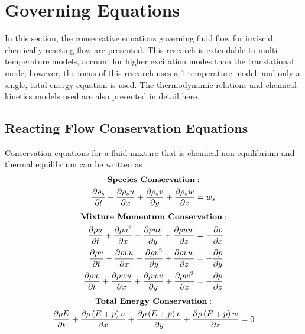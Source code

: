 \chapter{Governing Equations}
\label{chapter-two}

In this section, the conservative equations governing fluid flow for inviscid,
chemically reacting flow are presented.  This research is extendable to
multi-temperature models, account for higher excitation modes than the
translational mode; however, the focus of this research uses a 1-temperature
model, and only a single, total energy equation is used.  The thermodynamic
relations and chemical kinetics models used are also presented in detail here.

\section{Reacting Flow Conservation Equations}

Conservation equations for a fluid mixture that is chemical non-equilibrium and
thermal equilibrium can be written as
\begin{equation}
  \begin{gathered}
    \text{\bf{Species Conservation}}: \\
     \frac{\partial \rho_s}{\partial t} + \frac{\partial \rho_s u}{\partial x} + \frac{\partial \rho_s v}{\partial y} + \frac{\partial \rho_s w}{\partial z} =
     w_s
  \end{gathered}
  \label{species-cons}
\end{equation}
\begin{equation}
  \begin{gathered}
    \text{\bf{Mixture Momentum Conservation}}: \\
    \begin{aligned}
    \frac{\partial \rho u}{\partial t} + \frac{\partial \rho u^2}{\partial x} + \frac{\partial \rho u v}{\partial y} + \frac{\partial \rho u w}{\partial z} &= -\frac{\partial p}{\partial x}\\
    \frac{\partial \rho v}{\partial t} + \frac{\partial \rho v u}{\partial x} + \frac{\partial \rho v^2}{\partial y} + \frac{\partial \rho v w}{\partial z} &= -\frac{\partial p}{\partial y}\\
    \frac{\partial \rho w}{\partial t} + \frac{\partial \rho w u}{\partial x} + \frac{\partial \rho w v}{\partial y} + \frac{\partial \rho w^2}{\partial z} &= -\frac{\partial p}{\partial z}
    \end{aligned}
  \end{gathered}
  \label{mix-mom-cons}
\end{equation}
\begin{equation}
  \begin{gathered}
    \text{\bf{Total Energy Conservation}}: \\
     \frac{\partial \rho E}{\partial t} 
    + \frac{\partial \rho \left( E + p \right) u}{\partial x} 
    + \frac{\partial \rho \left( E + p \right) v}{\partial y}
    + \frac{\partial \rho \left( E + p \right) w}{\partial z} = 0
  \end{gathered}
  \label{tot-energy-cons}
\end{equation}

